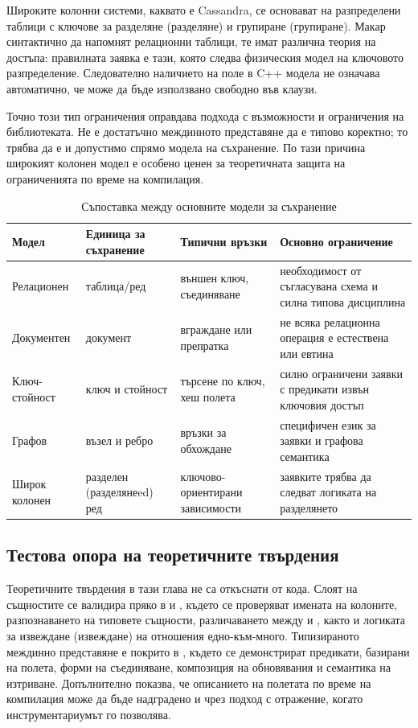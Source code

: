 Широките колонни системи, каквато е Cassandra, се основават на разпределени таблици с ключове за разделяне (разделяне) и групиране (групиране). Макар синтактично да напомнят релационни таблици, те имат различна теория на достъпа: правилната заявка е тази, която следва физическия модел на ключовото разпределение. Следователно наличието на поле в C++ модела не означава автоматично, че може да бъде използвано свободно във  клаузи.

Точно този тип ограничения оправдава подхода с възможности и ограничения на библиотеката. Не е достатъчно междинното представяне да е типово коректно; то трябва да е и допустимо спрямо модела на съхранение. По тази причина широкият колонен модел е особено ценен за теоретичната защита на ограниченията по време на компилация.

\begin{table}[H]
\centering
\small
\caption{Съпоставка между основните модели за съхранение}
\label{tab:storage_models}
\begin{tabularx}{\textwidth}{L{2.3cm}L{2.7cm}L{2.8cm}Y}
\toprule
\textbf{Модел} & \textbf{Единица за съхранение} & \textbf{Типични връзки} & \textbf{Основно ограничение} \\
\midrule
Релационен & таблица/ред & външен ключ, съединяване & необходимост от съгласувана схема и силна типова дисциплина \\
Документен & документ & вграждане или препратка & не всяка релационна операция е естествена или евтина \\
Ключ-стойност & ключ и стойност & търсене по ключ, хеш полета & силно ограничени заявки с предикати извън ключовия достъп \\
Графов & възел и ребро & връзки за обхождане & специфичен език за заявки и графова семантика \\
Широк колонен & разделен (разделянеed) ред & ключово-ориентирани зависимости & заявките трябва да следват логиката на разделянето \\
\bottomrule
\end{tabularx}
\end{table}

\subsection{Тестова опора на теоретичните твърдения}

Теоретичните твърдения в тази глава не са откъснати от кода. Слоят на същностите се валидира пряко в  и , където се проверяват имената на колоните, разпознаването на типовете същности, различаването между  и , както и логиката за извеждане (извеждане) на отношения едно-към-много. Типизираното междинно представяне е покрито в , където се демонстрират предикати, базирани на полета, форми на съединяване, композиция на обновявания и семантика на изтриване. Допълнително  показва, че описанието на полетата по време на компилация може да бъде надградено и чрез подход с отражение, когато инструментариумът го позволява.

